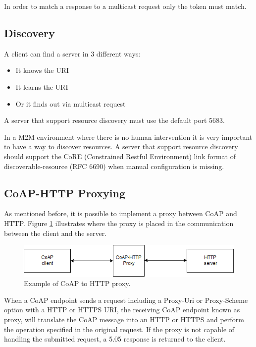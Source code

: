 	In order to match a response to a multicast request only the token must match.
	
	\subsection{Discovery}
	A client can find a server in 3 different ways:
	\begin{itemize}
		\item It knows the URI
		\item It learns the URI
		\item Or it finds out via multicast request
	\end{itemize}

	A server that support resource discovery must use the default port 5683.
	
	In a M2M environment where there is no human intervention it is very important to have a way to discover resources.\newline
	A server that support resource discovery should support the CoRE (Constrained Restful Environment) link format of discoverable-resource (RFC 6690) when manual configuration is missing.
	
	\subsection{CoAP-HTTP Proxying}
	As mentioned before, it is possible to implement a proxy between CoAP and HTTP.\newline
	Figure \ref{fig:coap2} illustrates where the proxy is placed in the communication between the client and the server.
	
	\begin{figure}
		\includegraphics[width=\linewidth]{coap-img1.png}
		\caption{Example of CoAP to HTTP proxy.}
		\label{fig:coap2}
	\end{figure}
	
	When a CoAP endpoint sends a request including a Proxy-Uri or Proxy-Scheme option with a HTTP or HTTPS URI, the receiving CoAP endpoint known as proxy, will translate the CoAP message into an HTTP or HTTPS and perform the operation specified in the original request.\newline
	If the proxy is not capable of handling the submitted request, a 5.05 response is returned to the client.
	
